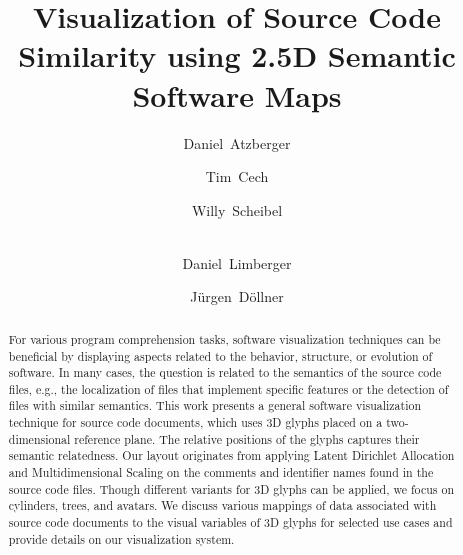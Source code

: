 \documentclass[runningheads]{llncs}
\begin{document}
\title{Visualization of Source Code Similarity using 2.5D Semantic Software Maps}
\author{%
    Daniel~Atzberger    \and
    Tim~Cech            \and
    Willy~Scheibel      \and\\ %
    Daniel~Limberger    \and %
    J{\"u}rgen~D{\"o}llner}

\begin{acronym}
\end{acronym}

\maketitle              %
\begin{abstract}
    For various program comprehension tasks, software visualization techniques can be beneficial by displaying aspects related to the behavior, structure, or evolution of software.
    In many cases, the question is related to the semantics of the source code files, e.g., the localization of files that implement specific features or the detection of files with similar semantics.
    This work presents a general software visualization technique for source code documents, which uses 3D glyphs placed on a two-dimensional reference plane. 
    The relative positions of the glyphs captures their semantic relatedness.
    Our layout originates from applying Latent Dirichlet Allocation and Multidimensional Scaling on the comments and identifier names found in the source code files.
    Though different variants for 3D glyphs can be applied, we focus on cylinders, trees, and avatars.
    We discuss various mappings of data associated with source code documents to the visual variables of 3D glyphs for selected use cases and provide details on our visualization system.
\end{abstract}
\end{document}
